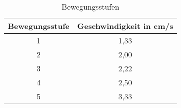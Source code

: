 \documentclass[12pt,a4paper]{scrbook}
\begin{document}
		\begin{table}[htpb]
			\centering
			\begin{tabular}{|c|c|}
				\hline
				\textbf{Bewegungsstufe} & \textbf{Geschwindigkeit in cm/s} \\
				\hline
				1 & 1,33 \\
				2 & 2,00 \\
				3 & 2,22 \\
				4 & 2,50 \\
				5 & 3,33 \\
				\hline
			\end{tabular}
			\caption{Bewegungsstufen}
			\label{tab:Bewegungsstufen}
		\end{table}
	


		
\end{document}

